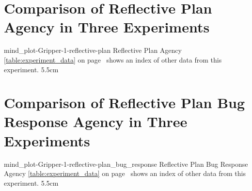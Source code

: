 {\clearpage
  \section{Comparison of Reflective Plan Agency in Three Experiments}
  \experimentcausegroupplots{\dataappendixmaxtime}
                            {\dataappendixexperimentonemaxtime}
                            {\dataappendixexperimenttwomaxtime}
                            {\dataappendixexperimentthreemaxtime}
                            {\dataappendixexperimentonename}
                            {\dataappendixexperimenttwoname}
                            {\dataappendixexperimentthreename}
                            {\dataappendixexperimentoneprettyname}
                            {\dataappendixexperimenttwoprettyname}
                            \experimentcausegroupplotscontinued{\dataappendixexperimentthreeprettyname}
                                                               {mind_plot-Gripper-1-reflective-plan}
                                                               {Reflective Plan Agency}
                                                               {  {\mbox{\autoref{table:experiment_data}}} on
                                                                 {\mbox{page~\pageref{table:experiment_data}}} shows an index of other data
                                                                 from this experiment.}
                                                               {5.5cm}
}
{\clearpage
  \section{Comparison of Reflective Plan Bug Response Agency in Three Experiments}
  \experimentcausegroupplots{\dataappendixmaxtime}
                            {\dataappendixexperimentonemaxtime}
                            {\dataappendixexperimenttwomaxtime}
                            {\dataappendixexperimentthreemaxtime}
                            {\dataappendixexperimentonename}
                            {\dataappendixexperimenttwoname}
                            {\dataappendixexperimentthreename}
                            {\dataappendixexperimentoneprettyname}
                            {\dataappendixexperimenttwoprettyname}
                            \experimentcausegroupplotscontinued{\dataappendixexperimentthreeprettyname}
                                                               {mind_plot-Gripper-1-reflective-plan_bug_response}
                                                               {Reflective Plan Bug Response Agency}
                                                               {  {\mbox{\autoref{table:experiment_data}}} on
                                                                 {\mbox{page~\pageref{table:experiment_data}}} shows an index of other data
                                                                 from this experiment.}
                                                               {5.5cm}
}
